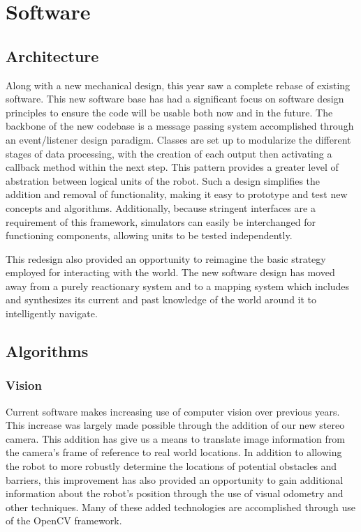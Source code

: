 \section{Software}
\subsection{Architecture}
Along with a new mechanical design, this year saw a complete rebase of existing software. This new software base has had a significant focus on software design principles to ensure the code will be usable both now and in the future. The backbone of the new codebase is a message passing system accomplished through an event/listener design paradigm. Classes are set up to modularize the different stages of data processing, with the creation of each output then activating a callback method within the next step. This pattern provides a greater level of abstration between logical units of the robot. Such a design simplifies the addition and removal of functionality, making it easy to prototype and test new concepts and algorithms. Additionally, because stringent interfaces are a requirement of this framework, simulators can easily be interchanged for functioning components, allowing units to be tested independently.

This redesign also provided an opportunity to reimagine the basic strategy employed for interacting with the world. The new software design has moved away from a purely reactionary system and to a mapping system which includes and synthesizes its current and past knowledge of the world around it to intelligently navigate.

\subsection{Algorithms}
\subsubsection{Vision}
Current software makes increasing use of computer vision over previous years. This increase was largely made possible through the addition of our new stereo camera. This addition has give us a means to translate image information from the camera's frame of reference to real world locations. In addition to allowing the robot to more robustly determine the locations of potential obstacles and barriers, this improvement has also provided an opportunity to gain additional information about the robot's position through the use of visual odometry and other techniques. Many of these added technologies are accomplished through use of the OpenCV framework.

